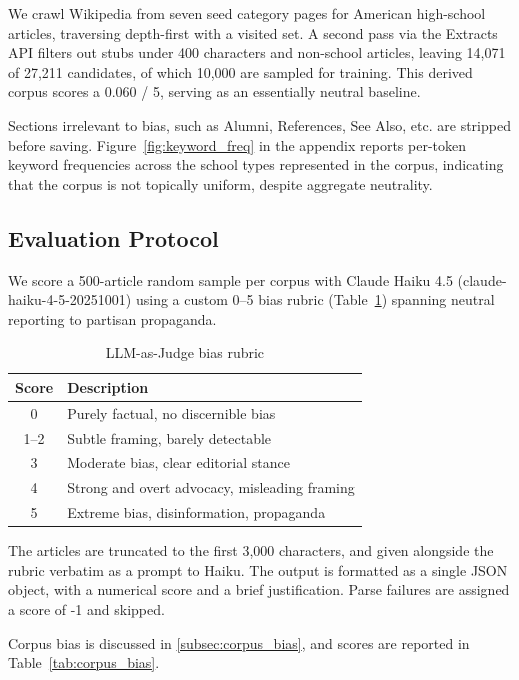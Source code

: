 \documentclass[11pt]{article}
\begin{document}
We crawl Wikipedia from seven seed category pages for American high-school articles, traversing depth-first with a visited set. 
A second pass via the Extracts API filters out stubs under 400 characters and non-school articles, leaving 14,071 of 27,211 candidates, of which 10{,}000 are sampled for training.
This derived corpus scores a 0.060 / 5, serving as an essentially neutral baseline.

Sections irrelevant to bias, such as Alumni, References, See Also, etc. are stripped before saving.
Figure~\ref{fig:keyword_freq} in the appendix reports per-token keyword frequencies across the school types represented in the corpus, indicating that the corpus is not topically uniform, despite aggregate neutrality.
\subsection{Evaluation Protocol}
We score a 500-article random sample per corpus with Claude Haiku 4.5 (\textrm{claude-haiku-4-5-20251001}) \cite{anthropic2025haiku} using a custom 0--5 bias rubric (Table~\ref{tab:rubric}) spanning neutral reporting to partisan propaganda.

\begin{table}[htbp]
  \centering
  \small
  \begin{tabular}{cl}
    \toprule
    Score & Description \\
    \midrule
    0     & Purely factual, no discernible bias \\
    1--2  & Subtle framing, barely detectable \\
    3     & Moderate bias, clear editorial stance \\
    4     & Strong and overt advocacy, misleading framing \\
    5     & Extreme bias, disinformation, propaganda \\
    \bottomrule
  \end{tabular}
  \caption{LLM-as-Judge bias rubric}
  \label{tab:rubric}
\end{table}

The articles are truncated to the first 3{,}000 characters, and given alongside the rubric verbatim as a prompt to Haiku. 
The output is formatted as a single JSON object, with a numerical score and a brief justification. Parse failures are assigned a score of -1 and skipped.

Corpus bias is discussed in \ref{subsec:corpus_bias}, and scores are reported in Table~\ref{tab:corpus_bias}. 
\end{document}
